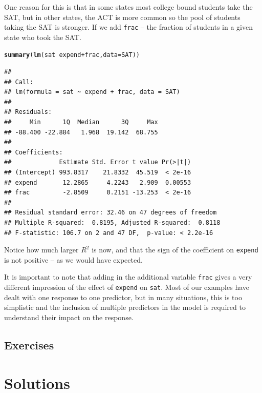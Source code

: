 \documentclass[twoside]{book}\usepackage[]{graphicx}\usepackage[]{xcolor}
\makeatletter
\newcommand{\hlopt}[1]{\textcolor[rgb]{0,0,0}{#1}}%
\newcommand{\hlstd}[1]{\textcolor[rgb]{0.345,0.345,0.345}{#1}}%
\newcommand{\hlkwc}[1]{\textcolor[rgb]{0.333,0.667,0.333}{#1}}%
\newcommand{\hlkwd}[1]{\textcolor[rgb]{0.737,0.353,0.396}{\textbf{#1}}}%
\newenvironment{kframe}{%
 \def\at@end@of@kframe{}%
 \ifinner\ifhmode%
  \def\at@end@of@kframe{\end{minipage}}%
  \begin{minipage}{\columnwidth}%
 \fi\fi%
 \def\FrameCommand##1{\hskip\@totalleftmargin \hskip-\fboxsep
 \colorbox{shadecolor}{##1}\hskip-\fboxsep
     \hskip-\linewidth \hskip-\@totalleftmargin \hskip\columnwidth}%
 \MakeFramed {\advance\hsize-\width
   \@totalleftmargin\z@ \linewidth\hsize
   \@setminipage}}%
 {\par\unskip\endMakeFramed%
 \at@end@of@kframe}
\newenvironment{knitrout}{}{} %
\newcommand{\variable}[1]{{\color{green!50!black}\texttt{#1}}}
\newcounter{example}[section]
\newif\ifsolutions
\newif\ifsolutionslocal
\makeatother
\begin{document}
One reason for this is that in some states most college bound students take the SAT, but in 
other states, the ACT is more common so the pool of students taking the SAT is stronger.
If we add \variable{frac} -- the fraction of students in a given state who took the SAT.
\begin{knitrout}
\color{fgcolor}\begin{kframe}
\begin{alltt}
\hlkwd{summary}\hlstd{(}\hlkwd{lm}\hlstd{(sat} \hlopt{~} \hlstd{expend} \hlopt{+} \hlstd{frac,} \hlkwc{data} \hlstd{= SAT))}
\end{alltt}
\begin{verbatim}
## 
## Call:
## lm(formula = sat ~ expend + frac, data = SAT)
## 
## Residuals:
##     Min      1Q  Median      3Q     Max 
## -88.400 -22.884   1.968  19.142  68.755 
## 
## Coefficients:
##             Estimate Std. Error t value Pr(>|t|)
## (Intercept) 993.8317    21.8332  45.519  < 2e-16
## expend       12.2865     4.2243   2.909  0.00553
## frac         -2.8509     0.2151 -13.253  < 2e-16
## 
## Residual standard error: 32.46 on 47 degrees of freedom
## Multiple R-squared:  0.8195,	Adjusted R-squared:  0.8118 
## F-statistic: 106.7 on 2 and 47 DF,  p-value: < 2.2e-16
\end{verbatim}
\end{kframe}
\end{knitrout}
Notice how much larger $R^2$ is now, and that the sign of the coefficient on \variable{expend}
is not positive -- as we would have expected.

It is important to note that adding in the additional variable \variable{frac} gives a very
different impression of the effect of \variable{expend} on \variable{sat}.  Most of our examples 
have dealt with one response to one predictor, but in many situations, this is too simplistic and
the inclusion of multiple predictors in the model is required to understand their impact on 
the response.






\newpage
\section*{Exercises}

\shipoutProblems


\ifsolutions
\ifsolutionslocal
\newpage
\section*{Solutions}
\shipoutSolutions
\fi
\fi

\backmatter



\printindex

\ifsolutions
\ifsolutionslocal\relax
\else
\newpage
\chapter*{Solutions}
\shipoutSolutions
\fi
\fi
\end{document}
